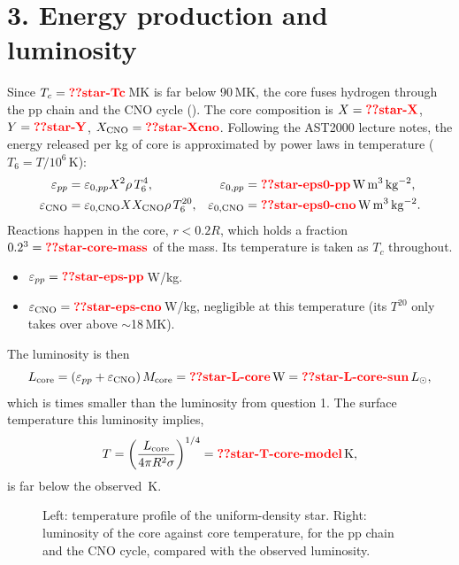 \documentclass[11pt,a4paper]{article}
\begin{document}
\section*{3. Energy production and luminosity}
Since $T_c=\val{star-Tc}$\,MK is far below 90\,MK, the core fuses hydrogen through the pp chain and the CNO cycle ().
The core composition is $X=\val{star-X}$, $Y=\val{star-Y}$, $X_{\rm CNO}=\val{star-Xcno}$.
Following the AST2000 lecture notes, the energy released per kg of core is approximated by power laws in temperature ($T_6=T/10^6$\,K):
\begin{align}
  \varepsilon_{pp}&=\varepsilon_{0,pp}X^2\rho\,T_6^4, &\varepsilon_{0,pp}&=\val{star-eps0-pp}\,\mathrm{W\,m^3\,kg^{-2}},\\
  \varepsilon_{\rm CNO}&=\varepsilon_{0,\rm CNO}XX_{\rm CNO}\rho\,T_6^{20}, &\varepsilon_{0,\rm CNO}&=\val{star-eps0-cno}\,\mathrm{W\,m^3\,kg^{-2}}.
\end{align}
Reactions happen in the core, $r<0.2R$, which holds a fraction $0.2^3=\val{star-core-mass}$ of the mass.
Its temperature is taken as $T_c$ throughout.
\begin{itemize}
\item $\varepsilon_{pp}=\val{star-eps-pp}$\,W/kg.
\item $\varepsilon_{\rm CNO}=\val{star-eps-cno}$\,W/kg, negligible at this temperature (its $T^{20}$ only takes over above $\sim$18\,MK).
\end{itemize}
The luminosity is then
\begin{equation}
  L_{\rm core}=(\varepsilon_{pp}+\varepsilon_{\rm CNO})\,M_{\rm core}=\val{star-L-core}\,\mathrm{W}=\val{star-L-core-sun}\,L_\odot ,
\end{equation}
which is  times smaller than the luminosity from question 1.
The surface temperature this luminosity implies,
\begin{equation}
  T=\left(\frac{L_{\rm core}}{4\pi R^2\sigma}\right)^{1/4}=\val{star-T-core-model}\,\mathrm{K},
\end{equation}
is far below the observed \,K.

\begin{figure}[h]\centering{}
\caption{Left: temperature profile of the uniform-density star. Right: luminosity of the core against core temperature, for the pp chain and the CNO cycle, compared with the observed luminosity.}\label{fig:core}\end{figure}
\end{document}
